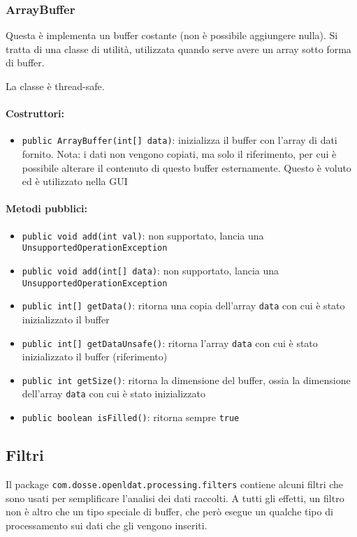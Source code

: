 \subsubsection{ArrayBuffer}
Questa è implementa un buffer costante (non è possibile aggiungere nulla). Si tratta di una classe di utilità, utilizzata quando serve avere un array sotto forma di buffer.

La classe è thread-safe.

\paragraph{Costruttori:}\begin{itemize}
	\item \texttt{public ArrayBuffer(int[] data)}: inizializza il buffer con l'array di dati fornito. Nota: i dati non vengono copiati, ma solo il riferimento, per cui è possibile alterare il contenuto di questo buffer esternamente. Questo è voluto ed è utilizzato nella GUI
\end{itemize}

\paragraph{Metodi pubblici:}\begin{itemize}
	\item \texttt{public void add(int val)}: non supportato, lancia una \texttt{UnsupportedOperationException}
	\item \texttt{public void add(int[] data)}: non supportato, lancia una \texttt{UnsupportedOperationException}
	\item \texttt{public int[] getData()}: ritorna una copia dell'array \texttt{data} con cui è stato inizializzato il buffer
	\item \texttt{public int[] getDataUnsafe()}: ritorna l'array \texttt{data} con cui è stato inizializzato il buffer (riferimento)
	\item \texttt{public int getSize()}: ritorna la dimensione del buffer, ossia la dimensione dell'array \texttt{data} con cui è stato inizializzato
	\item \texttt{public boolean isFilled()}: ritorna sempre \texttt{true}
\end{itemize}

\subsection{Filtri}
Il package \texttt{com.dosse.openldat.processing.filters} contiene alcuni filtri che sono usati per semplificare l'analisi dei dati raccolti. A tutti gli effetti, un filtro non è altro che un tipo speciale di buffer, che però esegue un qualche tipo di processamento sui dati che gli vengono inseriti.

